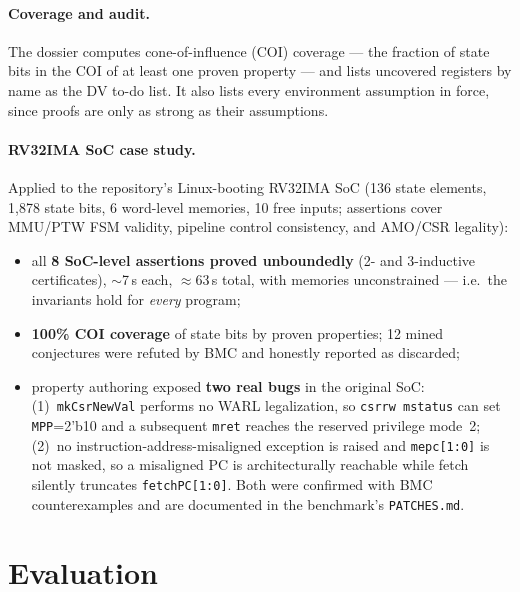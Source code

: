 \documentclass[11pt]{article}
\begin{document}
\paragraph{Coverage and audit.} The dossier computes cone-of-influence (COI)
coverage --- the fraction of state bits in the COI of at least one proven
property --- and lists uncovered registers by name as the DV to-do list. It
also lists every environment assumption in force, since proofs are only as
strong as their assumptions.

\paragraph{RV32IMA SoC case study.} Applied to the repository's
Linux-booting RV32IMA SoC (136 state elements, 1{,}878 state bits, 6
word-level memories, 10 free inputs; assertions cover MMU/PTW FSM validity,
pipeline control consistency, and AMO/CSR legality):

\begin{itemize}
  \item all \textbf{8 SoC-level assertions proved unboundedly}
        (2- and 3-inductive certificates), $\sim$7\,s each, $\approx$63\,s
        total, with memories unconstrained --- i.e.\ the invariants hold for
        \emph{every} program;
  \item \textbf{100\% COI coverage} of state bits by proven properties;
        12 mined conjectures were refuted by BMC and honestly reported as
        discarded;
  \item property authoring exposed \textbf{two real bugs} in the original
        SoC: (1)~\texttt{mkCsrNewVal} performs no WARL legalization, so
        \texttt{csrrw mstatus} can set \texttt{MPP}=2'b10 and a subsequent
        \texttt{mret} reaches the reserved privilege mode~2;
        (2)~no instruction-address-misaligned exception is raised and
        \texttt{mepc[1:0]} is not masked, so a misaligned PC is
        architecturally reachable while fetch silently truncates
        \texttt{fetchPC[1:0]}. Both were confirmed with BMC counterexamples
        and are documented in the benchmark's \texttt{PATCHES.md}.
\end{itemize}

\section{Evaluation}\label{sec:eval}
\end{document}
